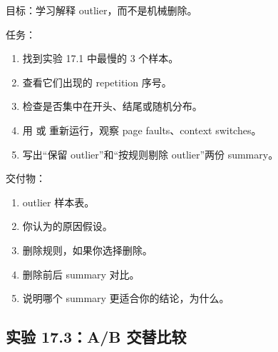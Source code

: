 \begin{labbox}
目标：学习解释 outlier，而不是机械删除。

任务：

\begin{enumerate}
  \item 找到实验 17.1 中最慢的 3 个样本。
  \item 查看它们出现的 repetition 序号。
  \item 检查是否集中在开头、结尾或随机分布。
  \item 用  或  重新运行，观察 page faults、context switches。
  \item 写出“保留 outlier”和“按规则剔除 outlier”两份 summary。
\end{enumerate}

交付物：

\begin{enumerate}
  \item outlier 样本表。
  \item 你认为的原因假设。
  \item 删除规则，如果你选择删除。
  \item 删除前后 summary 对比。
  \item 说明哪个 summary 更适合你的结论，为什么。
\end{enumerate}
\end{labbox}

\subsection{实验 17.3：A/B 交替比较}


